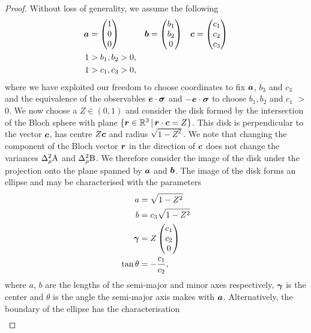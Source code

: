 \begin{proof}
Without loss of generality, we assume the following
\begin{align}
  \bm{a} &= \begin{pmatrix}1\\0\\0\end{pmatrix} &&
                                                \bm{b} = \begin{pmatrix}b_1\\b_2\\0\end{pmatrix} &&
  \bm{c} = \begin{pmatrix}c_1\\c_2\\c_3\end{pmatrix}\\
  1 &> b_1, b_2 > 0,\\
  1 &> c_1, c_3 > 0,
\end{align}
where we have exploited our freedom to choose coordinates to fix $\bm{a}$, $b_3$ and $c_3$ and the equivalence of the observables $\bm{e}\cdot{\boldsymbol\sigma}$ and $-\bm{e}\cdot{\boldsymbol\sigma}$ to choose $b_1, b_2$ and $c_1$ $>$ 0. We now choose a $Z\in (0,1)$ and consider the disk formed by the intersection of the Bloch sphere with plane $\{\bm{r}\in\mathbb{R}^3\,|\,\bm{r}\cdot\bm{c} = Z\}$. This disk is perpendicular to the vector $\bm{c}$, has centre $Z \bm{c}$ and radius $\sqrt{1-Z^2}$. We note that changing the component of the Bloch vector $\bm{r}$ in the direction of $\bm{c}$ does not change the variances $\varr{\opa}$ and $\varr{\opb}$. We therefore consider the image of the disk under the projection onto the plane spanned by $\bm{a}$ and $\bm{b}$. The image of the disk forms an ellipse and may be characterised with the parameters
\begin{align}
  a &= \sqrt{1-Z^2}\\
  b &= c_3\sqrt{1-Z^2}\\
  \bm{\gamma} &= Z \begin{pmatrix}c_1\\c_2\\0\end{pmatrix}\\
  \tan\theta &= -\frac{c_1}{c_2},
\end{align}
where $a$, $b$ are the lengths of the semi-major and minor axes respectively, $\bm{\gamma}$ is the center and $\theta$ is the angle the semi-major axis makes with $\bm{a}$. Alternatively, the boundary of the ellipse has the characterisation
\begin{align}

\end{align}
\end{proof}
